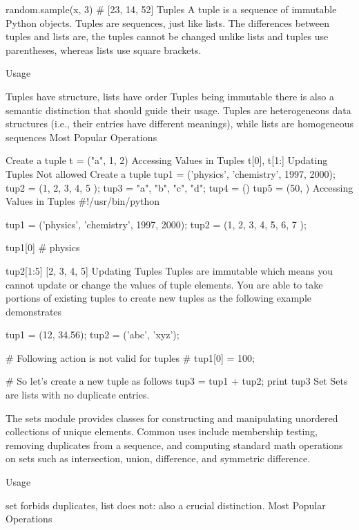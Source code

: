random.sample(x, 3) # [23, 14, 52]
Tuples
A tuple is a sequence of immutable Python objects. Tuples are sequences, just like lists. The differences between tuples and lists are, the tuples cannot be changed unlike lists and tuples use parentheses, whereas lists use square brackets.

Usage

Tuples have structure, lists have order
Tuples being immutable there is also a semantic distinction that should guide their usage. Tuples are heterogeneous data structures (i.e., their entries have different meanings), while lists are homogeneous sequences
Most Popular Operations

Create a tuple
t = ("a", 1, 2)
Accessing Values in Tuples
t[0], t[1:]
Updating Tuples
Not allowed
Create a tuple
tup1 = ('physics', 'chemistry', 1997, 2000);
tup2 = (1, 2, 3, 4, 5 );
tup3 = "a", "b", "c", "d";
tup4 = ()
tup5 = (50, )
Accessing Values in Tuples
#!/usr/bin/python

tup1 = ('physics', 'chemistry', 1997, 2000);
tup2 = (1, 2, 3, 4, 5, 6, 7 );

tup1[0]
# physics

tup2[1:5]
[2, 3, 4, 5]
Updating Tuples
Tuples are immutable which means you cannot update or change the values of tuple elements. You are able to take portions of existing tuples to create new tuples as the following example demonstrates

tup1 = (12, 34.56);
tup2 = ('abc', 'xyz');

# Following action is not valid for tuples
# tup1[0] = 100;

# So let's create a new tuple as follows
tup3 = tup1 + tup2;
print tup3
Set
Sets are lists with no duplicate entries.

The sets module provides classes for constructing and manipulating unordered collections of unique elements. Common uses include membership testing, removing duplicates from a sequence, and computing standard math operations on sets such as intersection, union, difference, and symmetric difference.

Usage

set forbids duplicates, list does not: also a crucial distinction.
Most Popular Operations

